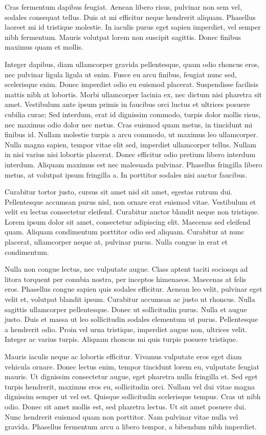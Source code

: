 Cras fermentum dapibus feugiat. Aenean libero risus, pulvinar non sem vel, sodales consequat tellus. Duis at mi efficitur neque hendrerit aliquam. Phasellus laoreet mi id tristique molestie. In iaculis purus eget sapien imperdiet, vel semper nibh fermentum. Mauris volutpat lorem non suscipit sagittis. Donec finibus maximus quam et mollis.

Integer dapibus, diam ullamcorper gravida pellentesque, quam odio rhoncus eros, nec pulvinar ligula ligula ut enim. Fusce eu arcu finibus, feugiat nunc sed, scelerisque enim. Donec imperdiet odio eu euismod placerat. Suspendisse facilisis mattis nibh at lobortis. Morbi ullamcorper lacinia ex, nec dictum nisi pharetra sit amet. Vestibulum ante ipsum primis in faucibus orci luctus et ultrices posuere cubilia curae; Sed interdum, erat id dignissim commodo, turpis dolor mollis risus, nec maximus odio dolor nec metus. Cras euismod quam metus, in tincidunt mi finibus id. Nullam molestie turpis a arcu commodo, ut maximus leo ullamcorper. Nulla magna sapien, tempor vitae elit sed, imperdiet ullamcorper tellus. Nullam in nisi varius nisi lobortis placerat. Donec efficitur odio pretium libero interdum interdum. Aliquam maximus est nec malesuada pulvinar. Phasellus fringilla libero metus, at volutpat ipsum fringilla a. In porttitor sodales nisi auctor faucibus.

Curabitur tortor justo, cursus sit amet nisl sit amet, egestas rutrum dui. Pellentesque accumsan purus nisl, non ornare erat euismod vitae. Vestibulum et velit eu lectus consectetur eleifend. Curabitur auctor blandit neque non tristique. Lorem ipsum dolor sit amet, consectetur adipiscing elit. Maecenas sed eleifend quam. Aliquam condimentum porttitor odio sed aliquam. Curabitur at nunc placerat, ullamcorper neque at, pulvinar purus. Nulla congue in erat et condimentum.

Nulla non congue lectus, nec vulputate augue. Class aptent taciti sociosqu ad litora torquent per conubia nostra, per inceptos himenaeos. Maecenas at felis eros. Phasellus congue sapien quis sodales efficitur. Aenean leo velit, pulvinar eget velit et, volutpat blandit ipsum. Curabitur accumsan ac justo ut rhoncus. Nulla sagittis ullamcorper pellentesque. Donec ut sollicitudin purus. Nulla et augue justo. Duis et massa ut leo sollicitudin sodales elementum ut purus. Pellentesque a hendrerit odio. Proin vel urna tristique, imperdiet augue non, ultrices velit. Integer ac varius turpis. Aliquam rhoncus mi quis turpis posuere tristique.

Mauris iaculis neque ac lobortis efficitur. Vivamus vulputate eros eget diam vehicula ornare. Donec lectus enim, tempor tincidunt lorem eu, vulputate feugiat mauris. Ut dignissim consectetur augue, eget pharetra nulla fringilla et. Sed eget turpis hendrerit, maximus eros eu, sollicitudin orci. Nullam vel dui vitae magna dignissim semper ut vel est. Quisque sollicitudin scelerisque tempus. Cras ut nibh odio. Donec sit amet mollis est, sed pharetra lectus. Ut sit amet posuere dui. Nunc hendrerit euismod quam non porttitor. Nam pulvinar vitae nulla vel gravida. Phasellus fermentum arcu a libero tempor, a bibendum nibh imperdiet.

